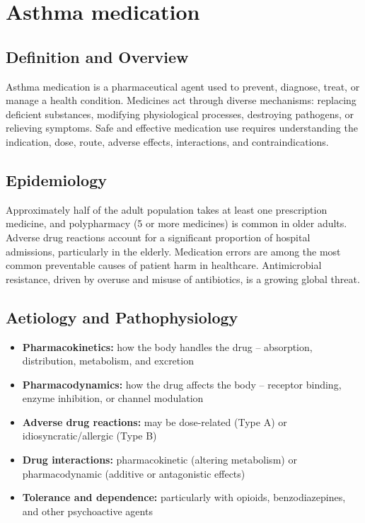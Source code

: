 \chapter{Asthma medication}

\section*{Definition and Overview}
Asthma medication is a pharmaceutical agent used to prevent, diagnose, treat, or manage a health condition. Medicines act through diverse mechanisms: replacing deficient substances, modifying physiological processes, destroying pathogens, or relieving symptoms. Safe and effective medication use requires understanding the indication, dose, route, adverse effects, interactions, and contraindications.

\section*{Epidemiology}
Approximately half of the adult population takes at least one prescription medicine, and polypharmacy (5 or more medicines) is common in older adults. Adverse drug reactions account for a significant proportion of hospital admissions, particularly in the elderly. Medication errors are among the most common preventable causes of patient harm in healthcare. Antimicrobial resistance, driven by overuse and misuse of antibiotics, is a growing global threat.

\section*{Aetiology and Pathophysiology}
\begin{itemize}
    \item \textbf{Pharmacokinetics:} how the body handles the drug -- absorption, distribution, metabolism, and excretion
    \item \textbf{Pharmacodynamics:} how the drug affects the body -- receptor binding, enzyme inhibition, or channel modulation
    \item \textbf{Adverse drug reactions:} may be dose-related (Type A) or idiosyncratic/allergic (Type B)
    \item \textbf{Drug interactions:} pharmacokinetic (altering metabolism) or pharmacodynamic (additive or antagonistic effects)
    \item \textbf{Tolerance and dependence:} particularly with opioids, benzodiazepines, and other psychoactive agents
\end{itemize}


